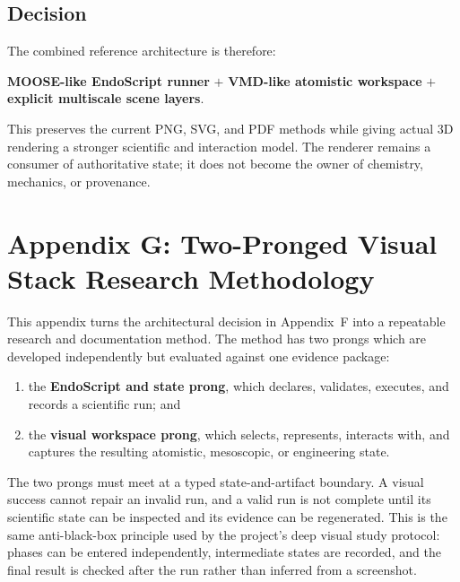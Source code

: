 \documentclass[11pt,a4paper]{article}
\begin{document}
\subsection{Decision}

The combined reference architecture is therefore:

\begin{center}
\large
\textbf{MOOSE-like EndoScript runner} $+$
\textbf{VMD-like atomistic workspace} $+$
\textbf{explicit multiscale scene layers}.
\end{center}

This preserves the current PNG, SVG, and PDF methods while giving actual 3D
rendering a stronger scientific and interaction model.  The renderer remains
a consumer of authoritative state; it does not become the owner of chemistry,
mechanics, or provenance.

\section{Appendix G: Two-Pronged Visual Stack Research Methodology}
\label{sec:appendix_visual_methodology}

This appendix turns the architectural decision in Appendix~F into a repeatable
research and documentation method.  The method has two prongs which are
developed independently but evaluated against one evidence package:

\begin{enumerate}
  \item the \textbf{EndoScript and state prong}, which declares, validates,
        executes, and records a scientific run; and
  \item the \textbf{visual workspace prong}, which selects, represents,
        interacts with, and captures the resulting atomistic, mesoscopic, or
        engineering state.
\end{enumerate}

The two prongs must meet at a typed state-and-artifact boundary.  A visual
success cannot repair an invalid run, and a valid run is not complete until its
scientific state can be inspected and its evidence can be regenerated.  This
is the same anti-black-box principle used by the project's deep visual study
protocol: phases can be entered independently, intermediate states are
recorded, and the final result is checked after the run rather than inferred
from a screenshot.
\end{document}
